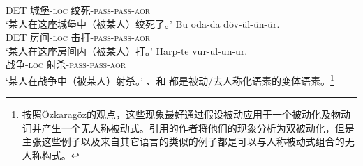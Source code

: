      DET 城堡-\textsc{loc} 绞死-\textsc{pass}-\textsc{pass}-\textsc{aor}\\
\glt `某人在这座城堡中（被某人）绞死了。'
\ex\label{ex-double-passivization-hit}
\gll Bu oda-da döv-ül-ün-ür.\\
     DET 房间-\textsc{loc} 击打-\textsc{pass}-\textsc{pass}-\textsc{aor}\\
\glt `某人在这座房间内（被某人）打。'
\ex
\gll Harp-te vur-ul-un-ur.\\
     战争-\textsc{loc} 射杀-\textsc{pass}-\textsc{pass}-\textsc{aor}\\
\glt `某人在战争中（被某人）射杀。'
\zl
{}、和 都是被动/去人称化语素的变体语素。\footnote{按照Özkara\-göz的观点，这些现象最好通过假设被动应用于一个被动化及物动词并产生一个无人称被动式。引用的作者将他们的现象分析为双被动化，但是\citet{Blevins2003a}主张这些例子以及来自其它语言的类似的例子都是可以与人称被动式组合的无人称构式。}

